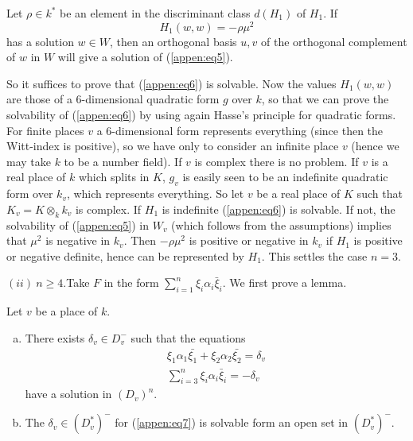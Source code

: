  Let $\rho \in k^*$ be an element in the discriminant class $d(H_1)$
 of $H_1$. If   
  \begin{equation*}
H_1(w,w)=-\rho \mu^2  \tag{6}\label{appen:eq6}
 \end{equation*} 
  has a solution $w \in W$, then an orthogonal basis $u,v$ of the
  orthogonal complement of $w$ in $W$ will give a solution of (\ref{appen:eq5}). 
 
 So it suffices to prove that (\ref{appen:eq6}) is solvable. Now the values
 $H_1(w,w)$ are those of a 6-dimensional quadratic form $g$ over
 $k$, so that we can prove the solvability of (\ref{appen:eq6}) by using again
 Hasse's principle for quadratic forms. For finite places $v$ a
 6-dimensional form represents everything (since then the Witt-index
 is positive), so we have only to consider an infinite place $v$ (hence
 we may take $k$ to be a number field). If $v$ is complex there is no
 problem. If $v$ is a real place of $k$ which splits in $K$, $g_v$ is
 easily seen to be an indefinite quadratic form over $k_v$, which
 represents everything. So let $v$ be a real place of $K$ such that
 $K_v=K \otimes_k k_v$ is complex. If $H_1$ is indefinite (\ref{appen:eq6}) is
 solvable. If not, the solvability of (\ref{appen:eq5}) in $W_v$ (which follows
 from the assumptions) implies that $\mu ^2$ is negative in
 $k_v$. Then $- \rho \mu^2$ is positive or negative in $k_v$ if $H_1$
 is positive or negative definite, hence can be represented by
 $H_1$. This settles the case $n=3$. 
 

 \noindent
 $(ii) ~n \ge 4$.\pageoriginale Take $F$ in the form $\sum
 \limits^{n}_{i=1} \xi_i  \alpha_i \bar{\xi}_i$. We first prove a
 lemma.  

\setcounter{lemma}{3}
\begin{lemma}\label{appen:lem3.4}%
 Let $v$ be a place of $k$.
\begin{enumerate}[(a)]
\item There exists $\delta_v \in D^-_v$ such that the equations
\begin{gather*}
\xi_1 \alpha_1 \bar{\xi_1}+\xi_2 \alpha_2 \bar{\xi_2} =\delta_v
\tag{7}\label{appen:eq7}\\ 
\sum^{n}_{i=3} \xi_i \alpha_i \bar{\xi}_i= -\delta_v
\end{gather*}
have a solution in $(D_v)^n$.

\item The $\delta_v \in (D^*_v)^-$ for (\ref{appen:eq7}) is solvable form
  an open set in $ (D^*_v)^-$. 
 \end{enumerate} 
 \end{lemma}
 
